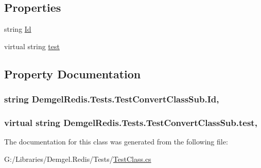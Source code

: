 \subsection*{Properties}
\begin{DoxyCompactItemize}
\item 
string \hyperlink{class_demgel_redis_1_1_tests_1_1_test_convert_class_sub_a095240e1d929ee7075e5d2ac12410d5a}{Id}
\item 
virtual string \hyperlink{class_demgel_redis_1_1_tests_1_1_test_convert_class_sub_a5d07c6d0b61d73af3be138de8e22b5ea}{test}
\end{DoxyCompactItemize}


\subsection{Property Documentation}
\hypertarget{class_demgel_redis_1_1_tests_1_1_test_convert_class_sub_a095240e1d929ee7075e5d2ac12410d5a}{}
\subsubsection[{Id}]{\setlength{\rightskip}{0pt plus 5cm}string Demgel\+Redis.\+Tests.\+Test\+Convert\+Class\+Sub.\+Id\hspace{0.3cm}{\ttfamily [get]}, {\ttfamily [set]}}\label{class_demgel_redis_1_1_tests_1_1_test_convert_class_sub_a095240e1d929ee7075e5d2ac12410d5a}
\hypertarget{class_demgel_redis_1_1_tests_1_1_test_convert_class_sub_a5d07c6d0b61d73af3be138de8e22b5ea}{}
\subsubsection[{test}]{\setlength{\rightskip}{0pt plus 5cm}virtual string Demgel\+Redis.\+Tests.\+Test\+Convert\+Class\+Sub.\+test\hspace{0.3cm}{\ttfamily [get]}, {\ttfamily [set]}}\label{class_demgel_redis_1_1_tests_1_1_test_convert_class_sub_a5d07c6d0b61d73af3be138de8e22b5ea}


The documentation for this class was generated from the following file\+:\begin{DoxyCompactItemize}
\item 
G\+:/\+Libraries/\+Demgel.\+Redis/\+Tests/\hyperlink{_test_class_8cs}{Test\+Class.\+cs}\end{DoxyCompactItemize}
